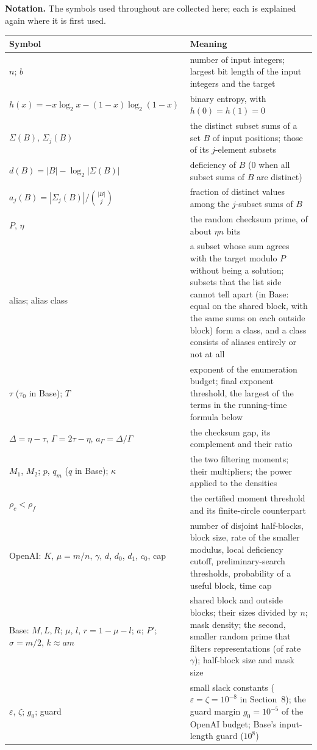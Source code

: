 \documentclass[11pt]{article}
\newcommand{\eps}{\varepsilon}
\theoremstyle{plain}
\begin{document}
\textbf{Notation.} The symbols used throughout are collected here; each is explained again where it is first used.

\begin{center}
\small
\begin{tabularx}{\linewidth}{>{\raggedright\arraybackslash}p{4.4cm} L}
\toprule
Symbol & Meaning \\
\midrule
$n$; $b$ & number of input integers; largest bit length of the input integers and the target \\
$h(x) = -x\log_2 x - (1-x)\log_2(1-x)$ & binary entropy, with $h(0) = h(1) = 0$ \\
$\Sigma(B)$, $\Sigma_j(B)$ & the distinct subset sums of a set $B$ of input positions; those of its $j$-element subsets \\
$d(B) = |B| - \log_2|\Sigma(B)|$ & deficiency of $B$ (0 when all subset sums of $B$ are distinct) \\
$a_j(B) = |\Sigma_j(B)|/\binom{|B|}{j}$ & fraction of distinct values among the $j$-subset sums of $B$ \\
$P$, $\eta$ & the random checksum prime, of about $\eta n$ bits \\
alias; alias class & a subset whose sum agrees with the target modulo $P$ without being a solution; subsets that the list side cannot tell apart (in Base: equal on the shared block, with the same sums on each outside block) form a class, and a class consists of aliases entirely or not at all \\
$\tau$ ($\tau_0$ in Base); $T$ & exponent of the enumeration budget; final exponent threshold, the largest of the terms in the running-time formula below \\
$\Delta = \eta - \tau$, $\Gamma = 2\tau - \eta$, $a_\Gamma = \Delta/\Gamma$ & the checksum gap, its complement and their ratio \\
$M_1$, $M_2$; $p$, $q_m$ ($q$ in Base); $\kappa$ & the two filtering moments; their multipliers; the power applied to the densities \\
$\rho_c < \rho_f$ & the certified moment threshold and its finite-circle counterpart \\
OpenAI: $K$, $\mu = m/n$, $\gamma$, $d$, $d_0$, $d_1$, $c_0$, cap & number of disjoint half-blocks, block size, rate of the smaller modulus, local deficiency cutoff, preliminary-search thresholds, probability of a useful block, time cap \\
Base: $M, L, R$; $\mu$, $l$, $r = 1 - \mu - l$; $a$; $P'$; $\sigma = m/2$, $k \approx am$ & shared block and outside blocks; their sizes divided by $n$; mask density; the second, smaller random prime that filters representations (of rate $\gamma$); half-block size and mask size \\
$\eps$, $\zeta$; $g_0$; guard & small slack constants ($\eps = \zeta = 10^{-8}$ in Section~8); the guard margin $g_0 = 10^{-5}$ of the OpenAI budget; Base's input-length guard ($10^8$) \\
\bottomrule
\end{tabularx}
\end{center}
\end{document}
